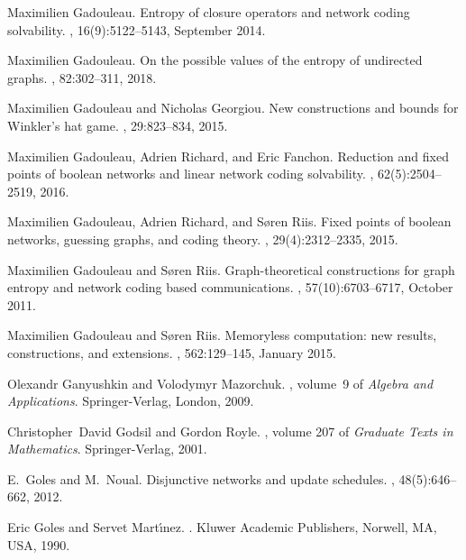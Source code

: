 \documentclass[a4paper, 11pt]{book}
\numberwithin{equation}{section}
\theoremstyle{plain}
\renewcommand{\(}{\ldbrack}
\renewcommand{\)}{\rdbrack}
\begin{document}
\begin{thebibliography}{100}
Maximilien Gadouleau.
\newblock Entropy of closure operators and network coding solvability.
, 16(9):5122--5143, September 2014.

Maximilien Gadouleau.
\newblock On the possible values of the entropy of undirected graphs.
, 82:302--311, 2018.

Maximilien Gadouleau and Nicholas Georgiou.
\newblock New constructions and bounds for {W}inkler's hat game.
, 29:823--834, 2015.

Maximilien Gadouleau, Adrien Richard, and Eric Fanchon.
\newblock Reduction and fixed points of boolean networks and linear network
  coding solvability.
, 62(5):2504--2519,
  2016.

Maximilien Gadouleau, Adrien Richard, and S\o{}ren Riis.
\newblock Fixed points of boolean networks, guessing graphs, and coding theory.
, 29(4):2312--2335, 2015.

Maximilien Gadouleau and S\o{}ren Riis.
\newblock Graph-theoretical constructions for graph entropy and network coding
  based communications.
, 57(10):6703--6717,
  October 2011.

Maximilien Gadouleau and S\o{}ren Riis.
\newblock Memoryless computation: new results, constructions, and extensions.
, 562:129--145, January 2015.

Olexandr Ganyushkin and Volodymyr Mazorchuk.
,
  volume~9 of {\em Algebra and Applications}.
\newblock Springer-Verlag, London, 2009.

Christopher~David Godsil and Gordon Royle.
, volume 207 of {\em Graduate Texts in
  Mathematics}.
\newblock Springer-Verlag, 2001.

E.~Goles and M.~Noual.
\newblock Disjunctive networks and update schedules.
, 48(5):646--662, 2012.

Eric Goles and Servet Mart\'{\i}nez.
.
\newblock Kluwer Academic Publishers, Norwell, MA, USA, 1990.


\end{thebibliography}
\end{document}
